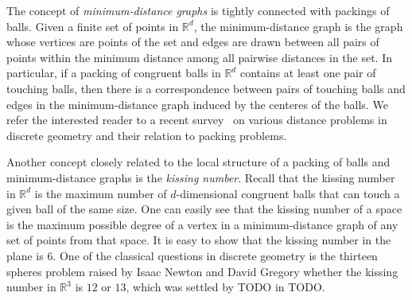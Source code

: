 The concept of \emph{minimum-distance graphs} is tightly connected with packings of balls.
Given a finite set of points in $\mathbb{R}^d$, the minimum-distance graph is the graph whose vertices are points of the set and edges are drawn between all pairs of points within the minimum distance among all pairwise distances in the set. In particular, if a packing of congruent balls in $\mathbb{R}^d$ contains at least one pair of touching balls, then there is a correspondence between pairs of touching balls and edges in the minimum-distance graph induced by the centeres of the balls. %
We refer the interested reader to a recent survey~\cite{Swanepoel2018} on various distance problems in discrete geometry and their relation to packing problems.


Another concept closely related to the local structure of a packing of balls and minimum-distance graphs is the \emph{kissing number}. Recall that the kissing number in $\mathbb{R}^d$ is the maximum number of $d$-dimensional congruent balls that can touch a given ball of the same size. One can easily see that the kissing number of a space is the maximum possible degree of a vertex in a minimum-distance graph of any set of points from that space.
It is easy to show that the kissing number in the plane is $6$. One of the classical questions in discrete geometry is the thirteen spheres problem raised by Isaac Newton and David Gregory whether the kissing number in $\mathbb{R}^3$ is $12$ or $13$, which was settled by TODO in TODO. %

